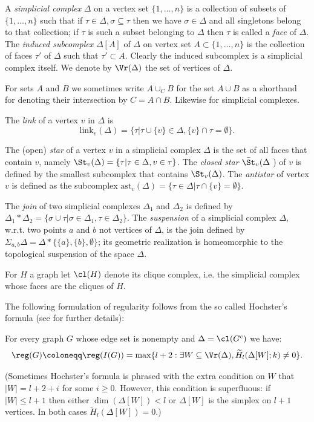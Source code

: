   A \emph{simplicial complex} $\Delta$ on a vertex set $\{1,\ldots, n\}$ is a collection of subsets of $\{1,\ldots ,n\}$ such that if $\tau \in \Delta, \sigma \subseteq \tau$ then we have $\sigma \in \Delta$ and all singletons belong to that collection; if $\tau$ is such a subset belonging to $\Delta$ then $\tau$ is called a \emph{face} of $\Delta$. 
 The \emph{induced subcomplex} $\Delta [A]$ of $\Delta$ on vertex set $A\subset \{1,\ldots,n\}$ is the collection of faces $\tau'$ of $\Delta$ such that $\tau' \subset A$. 
 Clearly the induced subcomplex is a simplicial complex itself. We denote by $\Vr(\Delta)$ the set of vertices of $\Delta$.

 For sets  $A$ and $B$ we sometimes write $A\cup_C B$ for the set $A\cup B$ as a shorthand for denoting their intersection by $C=A\cap B$. 
 Likewise for simplicial complexes.

 The \emph{link} of a vertex $v$ in $ \Delta$ is $$\text{link}_v (\Delta)= \{ \tau |\tau \cup \{v\} \in \Delta, \{v\} \cap \tau =\emptyset\}.$$

 The (open) \emph{star} of a vertex $v$ in a simplicial complex $\Delta$ is the set of all faces that contain $v$, namely $\St_v(\Delta)=\{\tau| \tau \in \Delta, v \in \tau\}$. The \emph{closed star} $\bar{\St}_v (\Delta$ ) of $v$ is defined by the smallest subcomplex that contains $\St_v(\Delta)$. The \emph{antistar} of vertex $v$ is defined as the subcomplex $\text{ast}_v (\Delta) = \{\tau \in \Delta| \tau \cap \{v\} = \emptyset\}$.


 The \emph{join} of two simplicial complexes $\Delta_1$ and $\Delta_2$ is defined by $\Delta_1 * \Delta_2=\{\sigma \cup \tau| \sigma \in \Delta_1, \tau \in \Delta_2\}$. 
 The \emph{suspension} of a simplicial complex $\Delta$, w.r.t. two points $a$ and $b$ not vertices of $\Delta$, is the join defined by $\Sigma_{a,b} \Delta=\Delta * \{\{a\},\{b\},\emptyset \}$; its geometric realization is homeomorphic to the topological suspension of the space $\Delta$.

  For $H$ a graph
  let $\cl(H)$ denote its clique complex, i.e. the simplicial complex whose faces are the cliques of $H$.

The following formulation of regularity follows from the so called Hochster's formula
(see {\cite{ms2005}} for further details):

\begin{theorem}
For every graph $G$ whose edge set is nonempty and $\Delta=\cl(G^c)$ we have:
$$\reg(G)\coloneqq\reg(I(G))= \max\{l+2:\exists W \subseteq \Vr(\Delta), \widetilde{H}_l(\Delta[W];k)\neq 0\}.$$
\end{theorem}
(Sometimes Hochster's formula is phrased with the extra condition on $W$ that $|W|=l+2+i$ for some $i\ge 0$. However, this condition is superfluous: if $|W|\le l+1$ then either $\dim(\Delta[W])<l$ or $\Delta[W]$ is the simplex on $l+1$ vertices. In both cases  $\widetilde{H}_l(\Delta[W])=0$.)
